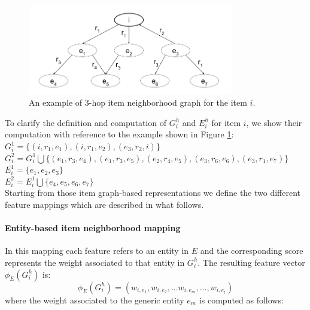 \begin{figure}
\begin{center}
\includegraphics[width=0.8\textwidth]{ch07_graph-rec_pics/item_neig2.png}
\end{center}
\caption{An example of 3-hop item neighborhood graph for the item $i$.}
\label{fig:graph-rec:Example}
\end{figure}

To clarify the definition and computation of $G^h_i$ and $E^h_i$ for item $i$, we show their computation with reference to the example shown in Figure \ref{fig:graph-rec:Example}:\\ 
$G^1_i= \lbrace (i,r_1,e_1), (i,r_1,e_2), (e_3,r_2,i)\rbrace$\\ 
$G^2_i= G^1_i \bigcup \lbrace (e_1,r_3,e_4), (e_1,r_3,e_5), (e_2,r_4,e_5), (e_3,r_6,e_6),(e_3,r_1,e_7) \rbrace$\\
$E^1_i= \lbrace e_1, e_2, e_3 \rbrace$\\
$E^2_i=  E^1_i \bigcup  \lbrace e_4, e_5, e_6, e_7 \rbrace$\\

Starting from those item graph-based representations we define the two different feature mappings which are described in what follows.
\paragraph*{\textbf{Entity-based item neighborhood mapping}}
In this mapping each feature refers to an entity in $E$ and the corresponding score represents the weight associated to that entity in $G^h_i$. The resulting feature vector $\phi_E(G^h_i)$ is:
\[
\phi_E(G^h_i)=(w_{i,e_1} ,w_{i,e_2} ,...w_{i,e_m} ,...,w_{i,e_t} )
\]
where the weight associated to the generic entity $e_m$ is computed as follows:

